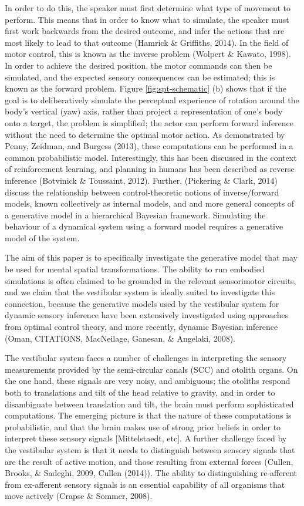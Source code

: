 \documentclass[english,floatsintext,man]{apa6}
\theoremstyle{definition}
\theoremstyle{definition}
\theoremstyle{remark}
\begin{document}
In order to do this, the speaker must first determine what type of
movement to perform. This means that in order to know what to simulate,
the speaker must first work backwards from the desired outcome, and
infer the actions that are most likely to lead to that outcome (Hamrick
\& Griffiths, 2014). In the field of motor control, this is known as the
inverse problem (Wolpert \& Kawato, 1998). In order to achieve the
desired position, the motor commands can then be simulated, and the
expected sensory consequences can be estimated; this is known as the
forward problem. Figure \ref{fig:spt-schematic} (b) shows that if the
goal is to deliberatively simulate the perceptual experience of rotation
around the body's vertical (yaw) axis, rather than project a
representation of one's body onto a target, the problem is simplified;
the actor can perform forward inference without the need to determine
the optimal motor action. As demonstrated by Penny, Zeidman, and Burgess
(2013), these computations can be performed in a common probabilistic
model. Interestingly, this has been discussed in the context of
reinforcement learning, and planning in humans has been described as
reverse inference (Botvinick \& Toussaint, 2012). Further, (Pickering \&
Clark, 2014) discuss the relationship between control-theoretic notions
of inverse/forward models, known collectively as internal models, and
and more general concepts of a generative model in a hierarchical
Bayesian framework. Simulating the behaviour of a dynamical system using
a forward model requires a generative model of the system.

The aim of this paper is to specifically investigate the generative
model that may be used for mental spatial transformations. The ability
to run embodied simulations is often claimed to be grounded in the
relevant sensorimotor circuits, and we claim that the vestibular system
is ideally suited to investigate this connection, because the generative
models used by the vestibular system for dynamic sensory inference have
been extensively investigated using approaches from optimal control
theory, and more recently, dynamic Bayesian inference (Oman, CITATIONS,
MacNeilage, Ganesan, \& Angelaki, 2008).

The vestibular system faces a number of challenges in interpreting the
sensory measurements provided by the semi-circular canals (SCC) and
otolith organs. On the one hand, these signals are very noisy, and
ambiguous; the otoliths respond both to translations and tilt of the
head relative to gravity, and in order to disambiguate between
translation and tilt, the brain must perform sophisticated computations.
The emerging picture is that the nature of these computations is
probabilistic, and that the brain makes use of strong prior beliefs in
order to interpret these sensory signals {[}Mittelstaedt, etc{]}. A
further challenge faced by the vestibular system is that it needs to
distinguish between sensory signals that are the result of active
motion, and those resulting from external forces (Cullen, Brooks, \&
Sadeghi, 2009, Cullen (2014)). The ability to distinguishing re-afferent
from ex-afferent sensory signals is an essential capability of all
organisms that move actively (Crapse \& Sommer, 2008).
\end{document}
